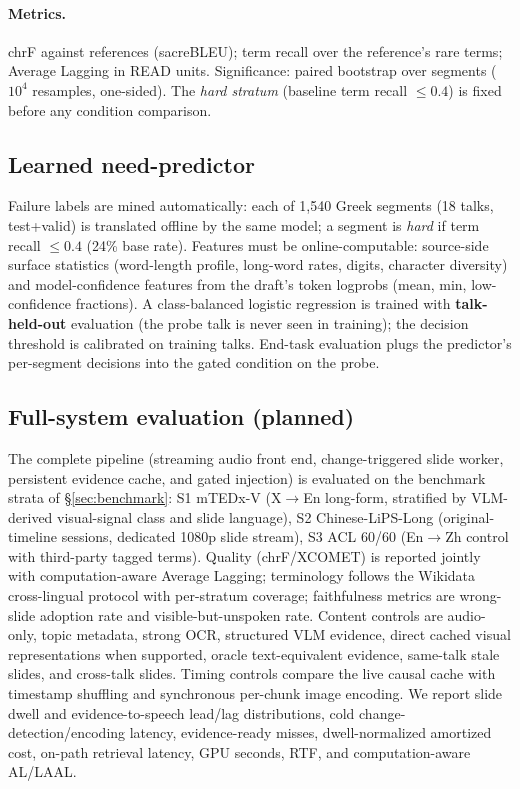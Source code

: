 \paragraph{Metrics.} chrF against references (sacreBLEU); term recall over the
reference's rare terms; Average Lagging \citep{ma2019stacl} in READ units.
Significance: paired bootstrap over segments ($10^4$ resamples, one-sided).
The \emph{hard stratum} (baseline term recall $\leq 0.4$) is fixed before any
condition comparison.

\subsection{Learned need-predictor}

Failure labels are mined automatically: each of 1{,}540 Greek segments (18
talks, test+valid) is translated offline by the same model; a segment is
\emph{hard} if term recall $\leq 0.4$ (24\% base rate). Features must be
online-computable: source-side surface statistics (word-length profile,
long-word rates, digits, character diversity) and model-confidence features
from the draft's token logprobs (mean, min, low-confidence fractions).
A class-balanced logistic regression is trained with \textbf{talk-held-out}
evaluation (the probe talk is never seen in training); the decision threshold
is calibrated on training talks. End-task evaluation plugs the predictor's
per-segment decisions into the gated condition on the probe.

\subsection{Full-system evaluation (planned)}

The complete pipeline (streaming audio front end, change-triggered slide worker,
persistent evidence cache, and gated injection) is evaluated on the benchmark strata of
\S\ref{sec:benchmark}: S1 mTEDx-V (X$\rightarrow$En long-form, stratified by
VLM-derived visual-signal class and slide language), S2 Chinese-LiPS-Long
(original-timeline sessions, dedicated 1080p slide stream), S3 ACL 60/60
(En$\rightarrow$Zh control with third-party tagged terms). Quality
(chrF/XCOMET) is reported jointly with computation-aware Average Lagging;
terminology follows the Wikidata cross-lingual protocol with per-stratum
coverage; faithfulness metrics are wrong-slide adoption rate and
visible-but-unspoken rate.
Content controls are audio-only, topic metadata, strong OCR, structured VLM
evidence, direct cached visual representations when supported, oracle
text-equivalent evidence, same-talk stale slides, and cross-talk slides. Timing
controls compare the live causal cache with timestamp shuffling and synchronous
per-chunk image encoding. We report slide dwell and evidence-to-speech lead/lag
distributions, cold change-detection/encoding latency, evidence-ready misses,
dwell-normalized amortized cost, on-path retrieval latency, GPU seconds, RTF,
and computation-aware AL/LAAL.
